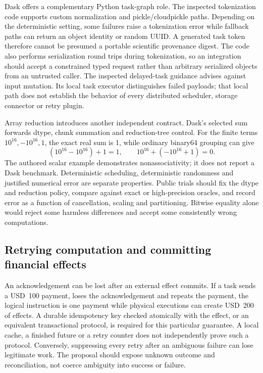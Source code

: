 Dask offers a complementary Python task-graph role. The inspected tokenization code supports custom normalization and pickle/cloudpickle paths. Depending on the deterministic setting, some failures raise a tokenization error while fallback paths can return an object identity or random UUID. A generated task token therefore cannot be presumed a portable scientific provenance digest. The code also performs serialization round trips during tokenization, so an integration should accept a constrained typed request rather than arbitrary serialized objects from an untrusted caller. The inspected delayed-task guidance advises against input mutation. Its local task executor distinguishes failed payloads; that local path does not establish the behavior of every distributed scheduler, storage connector or retry plugin.~\citep{exec25_dww_dask}

Array reduction introduces another independent contract. Dask's selected sum forwards dtype, chunk summation and reduction-tree control. For the finite terms $10^{16},-10^{16},1$, the exact real sum is 1, while ordinary binary64 grouping can give
\[
 (10^{16}-10^{16})+1=1,\qquad
 10^{16}+(-10^{16}+1)=0.
\]
The authored scalar example demonstrates nonassociativity; it does not report a Dask benchmark. Deterministic scheduling, deterministic randomness and justified numerical error are separate properties. Public trials should fix the dtype and reduction policy, compare against exact or high-precision oracles, and record error as a function of cancellation, scaling and partitioning. Bitwise equality alone would reject some harmless differences and accept some consistently wrong computations.~\citep{exec25_dww_dask,exec25_dww_choice}

\subsection{Retrying computation and committing financial effects}

An acknowledgement can be lost after an external effect commits. If a task sends a USD~100 payment, loses the acknowledgement and repeats the payment, the logical instruction is one payment while physical executions can create USD~200 of effects. A durable idempotency key checked atomically with the effect, or an equivalent transactional protocol, is required for this particular guarantee. A local cache, a finished future or a retry counter does not independently prove such a protocol. Conversely, suppressing every retry after an ambiguous failure can lose legitimate work. The proposal should expose unknown outcome and reconciliation, not coerce ambiguity into success or failure.~\citep{exec25_dww_choice}

